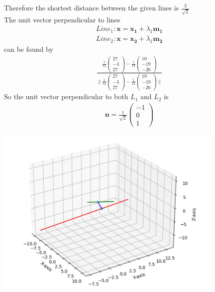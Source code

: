 \documentclass[journal,12pt,twocolumn]{IEEEtran}
\newcommand{\norm}[1]{\| #1 \|}
\begin{document}
Therefore the shortest distance between the given lines is $\frac{3}{\sqrt{2}}$\\
The unit vector perpendicular to lines \\
\begin{align}
    Line_1\colon \bm{x}=\bm{x_1}+\lambda_1\bm{m_1}\\
    Line_2\colon \bm{x}=\bm{x_2}+\lambda_1\bm{m_2}
\end{align}
can be found by 
\begin{align}
    \frac{\frac{1}{{12}}\begin{pmatrix}27\\-3\\27\end{pmatrix}-\frac{1}{{12}}\begin{pmatrix}10\\-19\\-26\end{pmatrix}}{\norm{\frac{1}{{12}}\begin{pmatrix}27\\-3\\27\end{pmatrix}-\frac{1}{{12}}\begin{pmatrix}10\\-19\\-26\end{pmatrix}}}
\end{align}
So the unit vector perpendicular to both $L_1$ and $L_2$ is
\begin{align}
    \bm{n}=\frac{1}{\sqrt{2}}\begin{pmatrix}-1\\0\\1\end{pmatrix}
\end{align}

\begin{center}
    \includegraphics[width=11cm]{assignment2.jpg}
\end{center}
\end{document}
